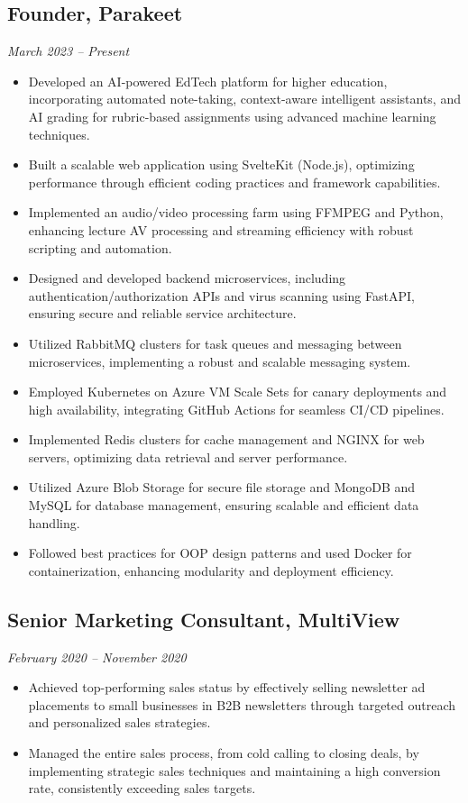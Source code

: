 \documentclass[a4paper,10pt]{article}
\begin{document}
\subsection*{Founder, Parakeet}
\textit{March 2023 -- Present}
\begin{itemize}
    \item Developed an AI-powered EdTech platform for higher education, incorporating automated note-taking, context-aware intelligent assistants, and AI grading for rubric-based assignments using advanced machine learning techniques.
    \item Built a scalable web application using SvelteKit (Node.js), optimizing performance through efficient coding practices and framework capabilities.
    \item Implemented an audio/video processing farm using FFMPEG and Python, enhancing lecture AV processing and streaming efficiency with robust scripting and automation.
    \item Designed and developed backend microservices, including authentication/authorization APIs and virus scanning using FastAPI, ensuring secure and reliable service architecture.
    \item Utilized RabbitMQ clusters for task queues and messaging between microservices, implementing a robust and scalable messaging system.
    \item Employed Kubernetes on Azure VM Scale Sets for canary deployments and high availability, integrating GitHub Actions for seamless CI/CD pipelines.
    \item Implemented Redis clusters for cache management and NGINX for web servers, optimizing data retrieval and server performance.
    \item Utilized Azure Blob Storage for secure file storage and MongoDB and MySQL for database management, ensuring scalable and efficient data handling.
    \item Followed best practices for OOP design patterns and used Docker for containerization, enhancing modularity and deployment efficiency.
\end{itemize}

\subsection*{Senior Marketing Consultant, MultiView}
\textit{February 2020 -- November 2020}
\begin{itemize}
    \item Achieved top-performing sales status by effectively selling newsletter ad placements to small businesses in B2B newsletters through targeted outreach and personalized sales strategies.
    \item Managed the entire sales process, from cold calling to closing deals, by implementing strategic sales techniques and maintaining a high conversion rate, consistently exceeding sales targets.
\end{itemize}
\end{document}
